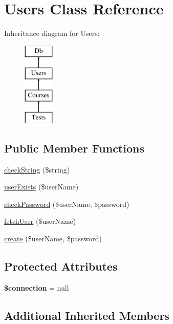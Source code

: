 \hypertarget{class_users}{\section{Users Class Reference}
\label{class_users}
}
Inheritance diagram for Users\-:\begin{figure}[H]
\begin{center}
\leavevmode
\includegraphics[height=4.000000cm]{class_users}
\end{center}
\end{figure}
\subsection*{Public Member Functions}
\begin{DoxyCompactItemize}
\item 
\hyperlink{class_users_a8fe0db35ee8e4bf70ab574b3d0d3cfd0}{check\-String} (\$string)
\item 
\hyperlink{class_users_a03f071927e9f1a1a1930622153ca76fa}{user\-Exists} (\$user\-Name)
\item 
\hyperlink{class_users_a7b27bffdb6648e9f5479b7bcbaf8a5e6}{check\-Password} (\$user\-Name, \$password)
\item 
\hyperlink{class_users_aac93d8c8a65d6be245c8243b85175b64}{fetch\-User} (\$user\-Name)
\item 
\hyperlink{class_users_a9ef91bc8e5330e06661bd8fc95ea98b3}{create} (\$user\-Name, \$password)
\end{DoxyCompactItemize}
\subsection*{Protected Attributes}
\begin{DoxyCompactItemize}
\item 
\hypertarget{class_users_a0d9c79b9b86b3f5891c6d3892f12c6a0}{{\bfseries \$connection} = null}\label{class_users_a0d9c79b9b86b3f5891c6d3892f12c6a0}

\end{DoxyCompactItemize}
\subsection*{Additional Inherited Members}


